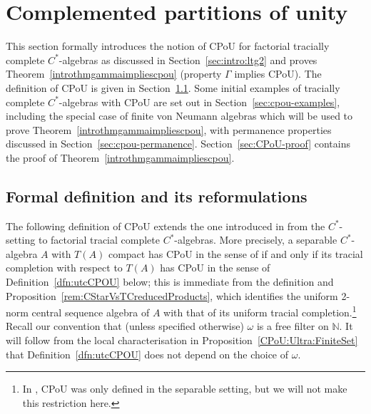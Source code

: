 \documentclass[a4paper,11pt]{amsart}
\theoremstyle{definition}
\numberwithin{equation}{section}
\numberwithin{theorem}{section}
\begin{document}
\section{Complemented partitions of unity}\label{sec:CPoU}

This section formally introduces the notion of CPoU for factorial tracially complete $C^*$-algebras as discussed in Section~\ref{sec:intro:ltg2} and proves Theorem~\ref{introthmgammaimpliescpou} (property $\Gamma$ implies CPoU).  The definition of CPoU is given in Section~\ref{sec:cpou-def}.  Some initial examples of tracially complete $C^*$-algebras with CPoU are set out in Section~\ref{sec:cpou-examples}, including the special case of finite von Neumann algebras which will be used to prove Theorem~\ref{introthmgammaimpliescpou}, with permanence properties discussed in Section~\ref{sec:cpou-permanence}.  Section~\ref{sec:CPoU-proof} contains the proof of Theorem~\ref{introthmgammaimpliescpou}.











\subsection{Formal definition and its reformulations}\label{sec:cpou-def}

The following definition of CPoU extends the one introduced in \cite{CETWW} from the $C^*$-setting to factorial tracial complete $C^*$-algebras.  More precisely, a separable $C^*$-algebra  $A$ with $T(A)$ compact has CPoU in the sense of \cite{CETWW} if and only if its tracial completion with respect to $T(A)$ has CPoU in the sense of Definition~\ref{dfn:utcCPOU} below; this is immediate from the definition and Proposition~\ref{rem:CStarVsTCreducedProducts}, which identifies the uniform 2-norm central sequence algebra of $A$ with that of its uniform tracial completion.\footnote{In \cite{CETWW}, CPoU was only defined in the separable setting, but we will not make this restriction here.}  Recall our convention that (unless specified otherwise) $\omega$ is a free filter on $\mathbb N$. It will follow from the local characterisation in Proposition~\ref{CPoU:Ultra:FiniteSet} that Definition~\ref{dfn:utcCPOU} does not depend on the choice of $\omega$.
\end{document}
